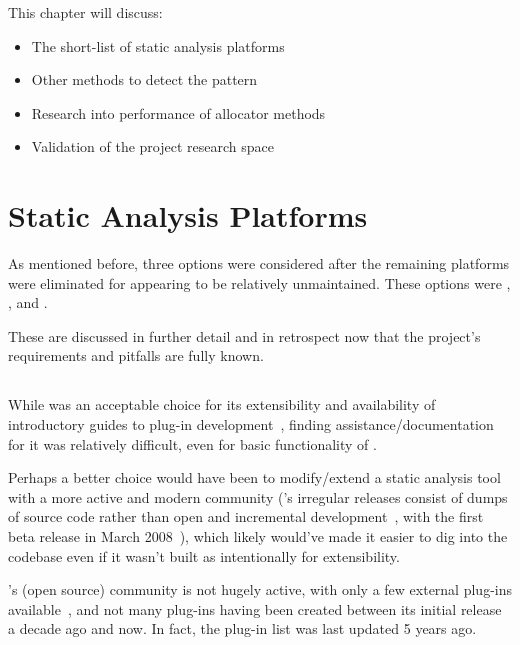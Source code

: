 This chapter will discuss:

\begin{itemize}
	\itemsep-0.25em
	\item The short-list of static analysis platforms
	\item Other methods to detect the pattern
	\item Research into performance of allocator methods
	\item Validation of the project research space
\end{itemize}

\section{Static Analysis Platforms}

As mentioned before, three options were considered after the remaining platforms were eliminated for appearing to be relatively unmaintained. These options were , , and .

These are discussed in further detail and in retrospect now that the project's requirements and pitfalls are fully known.

\subsection{}

While  was an acceptable choice for its extensibility and availability of introductory guides to plug-in development~\cite{framaplug}, finding assistance/documentation for it was relatively difficult, even for basic functionality of .

Perhaps a better choice would have been to modify/extend a static analysis tool with a more active and modern community ('s irregular releases consist of dumps of source code rather than open and incremental development~\cite{framagit}, with the first beta release in March 2008~\cite{framahydrogen}), which likely would've made it easier to dig into the codebase even if it wasn't built as intentionally for extensibility.

's (open source) community is not hugely active, with only a few external plug-ins available~\cite{framapluglist}, and not many plug-ins having been created between its initial release a decade ago and now. In fact, the plug-in list was last updated 5 years ago.

